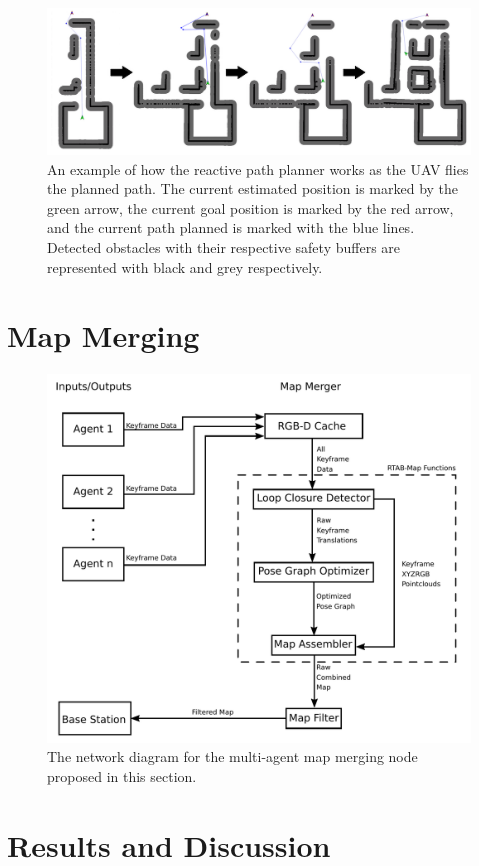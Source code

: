 \documentclass[letterpaper, 10 pt, conference]{ieeeconf}  %
\begin{document}
\begin{figure}
\centering
\includegraphics[width=1.0\linewidth]{adaptive_path_plan2.png}
\caption{An example of how the reactive path planner works as the UAV flies the planned path. The current estimated position is marked by the green arrow, the current goal position is marked by the red arrow, and the current path planned is marked with the blue lines. Detected obstacles with their respective safety buffers are represented with black and grey respectively.}
\label{fig:reactive_plan}
\end{figure}

\section{Map Merging}\label{merge}

\begin{figure}
\centering
\includegraphics[width=0.7\linewidth]{map_merger_network}
\caption{The network diagram for the multi-agent map merging node proposed in this section.}
\label{fig:map_merge}
\end{figure}
\section{Results and Discussion}\label{results}
\end{document}
